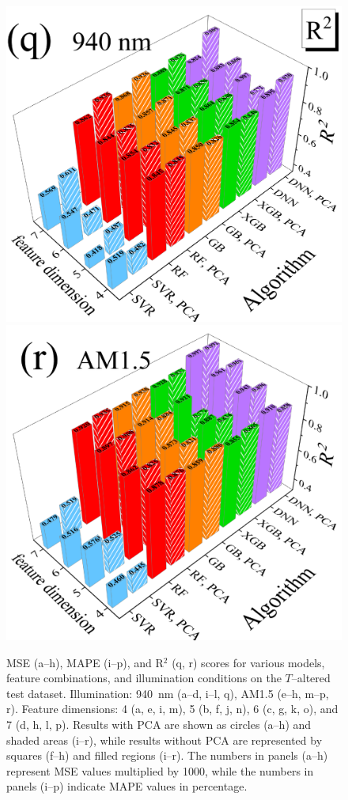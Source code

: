 \documentclass[a4paper,fleqn]{cas-sc}
\begin{document}
\begin{figure}
     \includegraphics[width=0.25\linewidth]{Fig9q.png}
     \includegraphics[width=0.25\linewidth]{Fig9r.png}
	  \caption{MSE (a--h), MAPE (i--p), and R$^{2}$ (q, r) scores for various models, feature combinations, and illumination conditions on the $T$--altered test dataset. Illumination: 940~nm (a--d, i--l, q), AM1.5 (e--h, m--p, r). Feature dimensions: 4 (a, e, i, m), 5 (b, f, j, n), 6 (c, g, k, o), and 7 (d, h, l, p). Results with PCA are shown as circles (a--h) and shaded areas (i--r), while results without PCA are represented by squares (f--h) and filled regions (i--r). The numbers in panels (a--h) represent MSE values multiplied by 1000, while the numbers in panels (i--p) indicate MAPE values in percentage.
}\label{fig9}
\end{figure}
\end{document}
